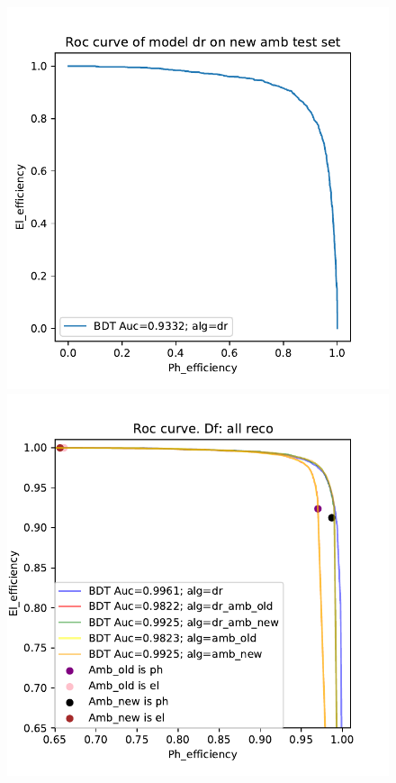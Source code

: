 \documentclass[a4paper, oneside]{book}
\begin{document}
			\begin{figure}[ht]
				\begin{minipage}[b]{0.5\linewidth}
					\centering
					\includegraphics[width=1.\linewidth]{tesi_images/dr_new.pdf}
					\caption{} 
					\label{fig:new_new}
					\vspace{4ex}
				\end{minipage}%
				\begin{minipage}[b]{0.5\linewidth}
					\centering
					\includegraphics[width=1.\linewidth]{tesi_images/all_roc.pdf} 
					\caption{} 
					\label{fig:all_roc}
					\vspace{4ex}
				\end{minipage} 
			\end{figure}
\end{document}
